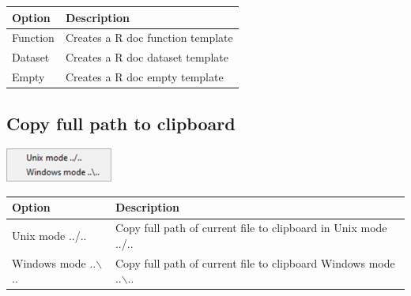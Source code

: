 \begin{scriptsize}
  \begin{tabularx}{\textwidth}{>{\hsize=0.3\hsize}X>{\hsize=0.8\hsize}X}\\
    \hline
    \textbf{Option} & \textbf{Description} \\
    \hline
    Function & Creates a R doc function template \\
    Dataset & Creates a R doc dataset template  \\
    Empty & Creates a R doc empty template \\
    \hline
  \end{tabularx}
\end{scriptsize}


\hypertarget{menu_file_copyfullpath}{}
\subsection{Copy full path to clipboard}

\includegraphics[scale=0.50]{./res/menu_file_copyfullpathtoclipboard.png}\\

\begin{scriptsize}
  \begin{tabularx}{\textwidth}{>{\hsize=0.3\hsize}X>{\hsize=0.8\hsize}X}\\
    \hline
    \textbf{Option} & \textbf{Description} \\
    \hline
    Unix mode ../.. & Copy full path of current file to clipboard in Unix mode ../.. \\
    Windows mode ..$\backslash$.. & Copy full path of current file to clipboard Windows mode ..$\backslash$.. \\
    \hline
  \end{tabularx}
\end{scriptsize}
